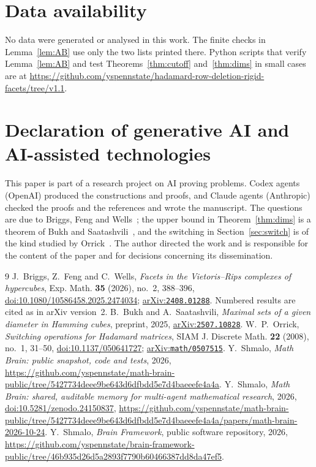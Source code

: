 \documentclass[11pt]{amsart}
\theoremstyle{remark}
\newcommand{\arxiv}[1]{\href{https://arxiv.org/abs/#1}{arXiv:\nolinkurl{#1}}}
\begin{document}
\section*{Data availability}
No data were generated or analysed in this work. The finite checks in Lemma~\ref{lem:AB} use only the two lists printed
there. Python scripts that verify Lemma~\ref{lem:AB} and test Theorems~\ref{thm:cutoff} and~\ref{thm:dims} in small
cases are at
\url{https://github.com/yspennstate/hadamard-row-deletion-rigid-facets/tree/v1.1}.

\section*{Declaration of generative AI and AI-assisted technologies}
This paper is part of a research project on AI proving problems. Codex agents (OpenAI) produced the constructions and
proofs, and Claude agents (Anthropic) checked the proofs and the references and wrote the manuscript. The questions are
due to Briggs, Feng and Wells~\cite{BFW}; the upper bound in Theorem~\ref{thm:dims} is a theorem of Bukh and
Saatashvili~\cite{BS}, and the switching in Section~\ref{sec:switch} is of the kind studied by Orrick~\cite{Orr}. The author directed the work and is responsible for the content of the paper
and for decisions concerning its dissemination.

\begin{thebibliography}{9}
 J.~Briggs, Z.~Feng and C.~Wells, \emph{Facets in the Vietoris--Rips complexes of hypercubes},
Exp. Math. \textbf{35} (2026), no.~2, 388--396, \href{https://doi.org/10.1080/10586458.2025.2474034}{doi:10.1080/10586458.2025.2474034};
\arxiv{2408.01288}. Numbered results are cited as in arXiv version~2.
 B.~Bukh and A.~Saatashvili, \emph{Maximal sets of a given diameter in Hamming cubes}, preprint, 2025,
\arxiv{2507.10828}.
 W.~P.~Orrick, \emph{Switching operations for Hadamard matrices}, SIAM J. Discrete Math. \textbf{22}
(2008), no.~1, 31--50, \href{https://doi.org/10.1137/050641727}{doi:10.1137/050641727}; \arxiv{math/0507515}.
 Y.~Shmalo, \emph{Math Brain: public snapshot, code and tests}, 2026,
\url{https://github.com/yspennstate/math-brain-public/tree/5427734deee9be643d6dfbdd5e7d4baeeefe4a4a}.
 Y.~Shmalo, \emph{Math Brain: shared, auditable memory for multi-agent mathematical
research}, 2026, \href{https://doi.org/10.5281/zenodo.24150837}{doi:10.5281/zenodo.24150837},
\url{https://github.com/yspennstate/math-brain-public/tree/5427734deee9be643d6dfbdd5e7d4baeeefe4a4a/papers/math-brain-2026-10-24}.
 Y.~Shmalo, \emph{Brain Framework}, public software repository, 2026,
\url{https://github.com/yspennstate/brain-framework-public/tree/46b935d26d5a2893f7790b60466387dd8da47ef5}.
\end{thebibliography}
\end{document}
